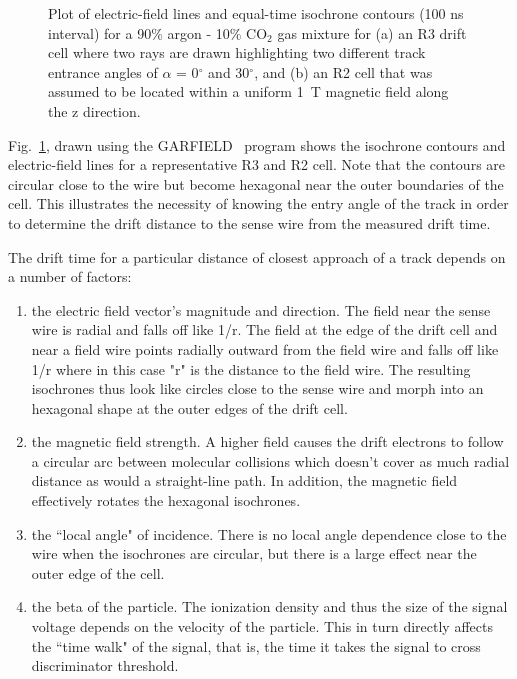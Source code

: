 \documentclass{article}
\begin{document}
\begin{figure}[htpb]
\vspace{7.5cm} 
\caption{\small{Plot of electric-field lines and equal-time isochrone contours
(100 ns interval) for a 90$\%$ argon - 10$\%$ CO$_2$ gas mixture for (a) an R3
drift cell where two rays are drawn highlighting two different track entrance 
angles of $\alpha$ = 0$^{\circ}$ and 30$^{\circ}$, and (b) an R2 cell that 
was assumed to be located within a uniform 1~T magnetic field along the z 
direction.}}
\label{garfield}
\end{figure}

Fig.~\ref{garfield}, drawn using the GARFIELD~\cite{garfield} program 
shows the isochrone contours and electric-field lines for 
a representative R3 and R2 cell.  Note that the contours are circular close 
to the wire but become hexagonal near the outer boundaries of the cell.  This 
illustrates the necessity of knowing the entry angle of the track in order to 
determine the drift distance to the sense wire from the measured drift time.

The drift time for a particular distance of closest approach of a track 
depends on a number of factors:
\begin{enumerate}
\item the electric field vector's magnitude and direction.
The field near the sense wire is radial and falls off like 1/r.
The field at the edge of the drift cell and near a field wire points
   radially outward from the field wire and falls off like 1/r where in this case
   "r" is the distance to the field wire.  The resulting isochrones thus look like
   circles close to the sense wire and morph into an hexagonal shape at the outer
   edges of the drift cell.
\item the magnetic field strength.  A higher field causes the drift electrons to follow
   a circular arc between molecular collisions which doesn't cover as much radial distance
   as would a straight-line path.  In addition, the magnetic field effectively rotates the
   hexagonal isochrones.
\item the ``local angle" of incidence.  There is no local angle dependence close to the wire
   when the isochrones are circular, but there is a large effect near the outer edge
   of the cell.
\item the beta of the particle.  The ionization density and thus the size of the signal
   voltage depends on the velocity of the particle.  This in turn directly affects the
   ``time walk" of the signal, that is, the time it takes the signal to cross discriminator
   threshold.
\end{enumerate}
\end{document}
